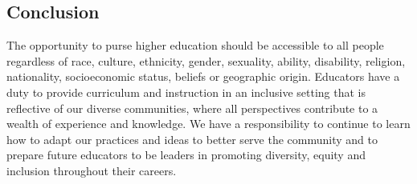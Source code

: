 \documentclass[11pt]{article}
\begin{document}


\subsection*{Conclusion}

The opportunity to purse higher education should be accessible to all people regardless of race, culture, ethnicity, gender, sexuality, ability, disability, religion, nationality, socioeconomic status, beliefs or geographic origin. Educators have a duty to provide curriculum and instruction in an inclusive setting that is reflective of our diverse communities, where all perspectives contribute to a wealth of experience and knowledge. We have a responsibility to continue to learn how to adapt our practices and ideas to better serve the community and to prepare future educators to be leaders in promoting diversity, equity and inclusion throughout their careers. %












 
\end{document}
